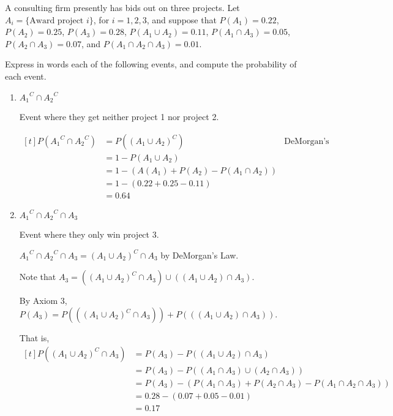 \begin{example}[MMSA ex. 15]
    A consulting firm presently has bids out on three projects. Let $A_i = \{ \text{Award project } i \}$, for $i = 1, 2, 3$, and suppose that $P(A_1) = 0.22$, $P(A_2) = 0.25$, $P(A_3) = 0.28$, $P(A_1 \cup A_2) = 0.11$, $P(A_1 \cap A_3) = 0.05$, $P(A_2 \cap A_3) = 0.07$, and $P(A_1 \cap A_2 \cap A_3) = 0.01$. 

    Express in words each of the following events, and compute the probability of each event.

    \begin{enumerate}[label=\alph*)]
        \item ${A_1}^C \cap {A_2}^C$
        
        Event where they get neither project 1 nor project 2. 

        $\begin{aligned}[t]
            P({A_1}^C \cap {A_2}^C) & = P((A_1 \cup A_2)^C)                     & \text{DeMorgan's Law} \\
                                    & = 1 - P(A_1 \cup A_2)                                             \\
                                    & = 1 - (A(A_1) + P(A_2) - P(A_1 \cap A_2))                         \\
                                    & = 1 - (0.22 + 0.25 - 0.11)                                        \\
                                    & = 0.64
        \end{aligned}$

        \item ${A_1}^C \cap {A_2}^C \cap A_3$ 
        
        Event where they only win project 3. 

        ${A_1}^C \cap {A_2}^C \cap A_3 = (A_1 \cup A_2)^C \cap A_3$ by DeMorgan's Law. 

        Note that $A_3 = ((A_1 \cup A_2)^C \cap A_3) \cup ((A_1 \cup A_2) \cap A_3)$.

        By Axiom 3, $P(A_3) = P(((A_1 \cup A_2)^C \cap A_3)) + P(((A_1 \cup A_2) \cap A_3))$. 

        That is, $\begin{aligned}[t]
            P((A_1 \cup A_2)^C \cap A_3)
             & = P(A_3) - P((A_1 \cup A_2) \cap A_3)                                     \\
             & = P(A_3) - P((A_1 \cap A_3) \cup (A_2 \cap A_3))                          \\
             & = P(A_3) - (P(A_1 \cap A_3) + P(A_2 \cap A_3) - P(A_1 \cap A_2 \cap A_3)) \\
             & = 0.28 - (0.07 + 0.05 - 0.01)                                             \\
             & = 0.17
        \end{aligned}$


\end{enumerate}
\end{example}
